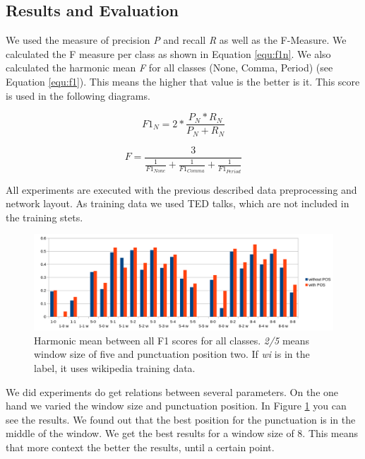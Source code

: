\subsection{Results and Evaluation}

We used the measure of precision \emph{P} and recall \emph{R} as well as the F-Measure. We calculated the F measure per class as shown in Equation \ref{equ:f1n}.
We also calculated the harmonic mean \emph{F} for all classes (None, Comma, Period) (see Equation \ref{equ:f1}). This means the higher that value is the better is it. This score is used in the following diagrams.

\begin{equation}
\label{equ:f1n}
F1_{N} = 2 * \frac{P_{N}* R_{N}}{P_{N}+R_{N}}
\end{equation}

\begin{equation}
\label{equ:f1}
F = \frac{3}{\frac{1}{F1_{None}} + \frac{1}{F1_{Comma}} + \frac{1}{F1_{Period}}}
\end{equation}

All experiments are executed with the previous described data preprocessing and network layout.
As training data we used TED talks, which are not included in the training stets. 

\begin{figure}[ht]
    \centering
    \includegraphics[width=\textwidth]{img/window_eval.png}
    \caption{Harmonic mean between all F1 scores for all classes. \emph{2/5} means window size of five and punctuation position two. If \emph{wi} is in the label, it uses wikipedia training data.}
    \label{fig:window_eval}
\end{figure}

We did experiments do get relations between several parameters.
On the one hand we varied the window size and punctuation position.
In Figure \ref{fig:window_eval} you can see the results. 
We found out that the best position for the punctuation is in the middle of the window.
We get the best results for a window size of 8. 
This means that more context the better the results, until a certain point.

